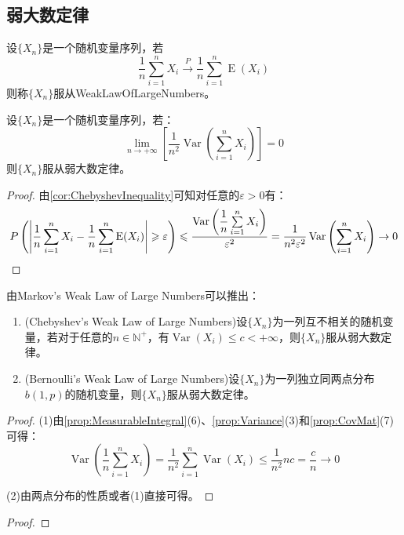 \subsection{弱大数定律}
\begin{definition}
	设$\{X_n\}$是一个随机变量序列，若
	\begin{equation*}
		\frac{1}{n}\sum_{i=1}^{n}X_i\overset{P}{\longrightarrow}\frac{1}{n}\sum_{i=1}^{n}\operatorname{E}(X_i)
	\end{equation*}
	则称$\{X_n\}$服从\gls{WeakLawOfLargeNumbers}。
\end{definition}
\begin{theorem}
	设$\{X_n\}$是一个随机变量序列，若：
	\begin{equation*}
		\lim_{n\to+\infty}\left[\frac{1}{n^2}\operatorname{Var}\left(\sum_{i=1}^{n}X_i\right)\right]=0
	\end{equation*}
	则$\{X_n\}$服从弱大数定律。
\end{theorem}
\begin{proof}
	由\cref{cor:ChebyshevInequality}可知对任意的$\varepsilon>0$有：
	\begin{equation*}
		P\left(\left|\frac{1}{n}\sum_{i=1}^{n}X_i-\frac{1}{n}\sum_{i=1}^{n}\operatorname{E}(X_i)\right|\geqslant\varepsilon\right)\leqslant\frac{\operatorname{Var}\left(\dfrac{1}{n}\sum\limits_{i=1}^{n}X_i\right)}{\varepsilon^2}=\frac{1}{n^2\varepsilon^2}\operatorname{Var}\left(\sum_{i=1}^{n}X_i\right)\to0\qedhere
	\end{equation*}
\end{proof}
\begin{corollary}
	由Markov's Weak Law of Large Numbers可以推出：
	\begin{enumerate}
		\item (Chebyshev's Weak Law of Large Numbers)设$\{X_n\}$为一列互不相关的随机变量，若对于任意的$n\in\mathbb{N}^+$，有$\operatorname{Var}(X_i)\leqslant c<+\infty$，则$\{X_n\}$服从弱大数定律。
		\item (Bernoulli's Weak Law of Large Numbers)设$\{X_n\}$为一列独立同两点分布$b(1,p)$的随机变量，则$\{X_n\}$服从弱大数定律。
	\end{enumerate}
\end{corollary}
\begin{proof}
	(1)由\cref{prop:MeasurableIntegral}(6)、\cref{prop:Variance}(3)和\cref{prop:CovMat}(7)可得：
	\begin{equation*}
		\operatorname{Var}\left(\frac{1}{n}\sum_{i=1}^{n}X_i\right)=\frac{1}{n^2}\sum_{i=1}^{n}\operatorname{Var}(X_i)\leqslant\frac{1}{n^2}nc=\frac{c}{n}\to0
	\end{equation*}\par
	(2)由两点分布的性质或者(1)直接可得。
\end{proof}
\begin{proof}
\end{proof}

